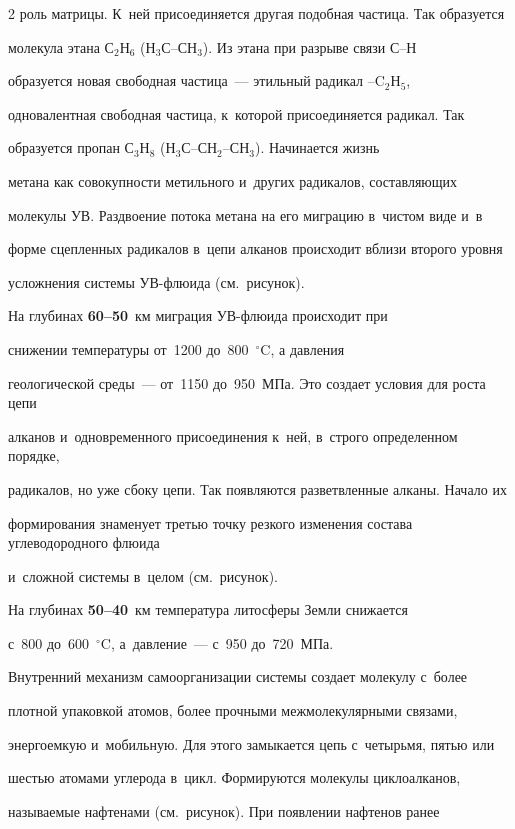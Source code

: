 \begin{multicols}{2}
роль матрицы. К~ней присоединяется другая подобная частица. Так образуется 

молекула этана С$_2$Н$_6$ (Н$_3$С--СН$_3$). Из этана при разрыве связи \mbox{С--Н} 

образуется новая свободная частица~--- этильный радикал --C$_2$Н$_5$, 

одновалентная свободная частица, к~которой присоединяется радикал. Так 

образуется пропан С$_3$Н$_8$ (Н$_3$С--СН$_2$--СН$_3$). Начинается жизнь 

метана как совокупности метильного и~других радикалов, составляющих  

мо\-ле\-ку\-лы УВ. Раздвоение потока метана на его миграцию в~чистом виде и~в 

форме сцепленных радикалов в~цепи алканов происходит вблизи второго уровня 

усложнения системы УВ-флюида (см.\ рисунок).

    

    На глубинах \textbf{60--50}~км миграция УВ-флюида происходит при 

снижении температуры от~1200 до~800~$^\circ$C, а давления 

геологической среды~--- от~1150 до~950~МПа. Это создает условия для роста цепи 

алканов и~одновременного присоединения к~ней, в~строго определенном порядке, 

радикалов, но уже сбоку цепи. Так появляются разветвленные алканы. Начало их 

формирования знаменует третью точку резкого изменения состава углеводородного флю\-ида 

и~сложной системы в~целом (см.\ рисунок).

    

    На глубинах \textbf{50--40}~км температура литосферы Земли снижается 

с~800 до~600~$^\circ$C, а~давление~--- с~950 до~720~МПа. 

Внутренний механизм самоорганизации системы создает молекулу с~более 

плот\-ной упаковкой атомов, более прочными межмолекулярными связами, 

энергоемкую и~мобильную. Для этого замыкается цепь с~четырьмя, пятью или 

шестью атомами углерода в~цикл. Формируются молекулы циклоалканов, 

называемые нафтенами (см.\ рисунок). При появлении нафтенов ранее 


\end{multicols}
